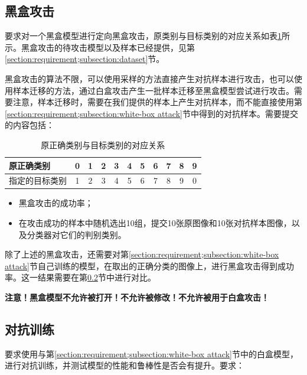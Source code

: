 \documentclass[journal, a4paper]{IEEEtran}
\begin{document}
\subsection{黑盒攻击}
\label{section:requirement;subsection:black-box attack}

要求对一个黑盒模型进行定向黑盒攻击，原类别与目标类别的对应关系如表\ref{table:label}所示。黑盒攻击的待攻击模型以及样本已经提供，见第\ref{section:requirement;subsection:dataset}节。

黑盒攻击的算法不限，可以使用采样的方法直接产生对抗样本进行攻击，也可以使用样本迁移的方法，通过白盒攻击产生一批样本迁移至黑盒模型尝试进行攻击。需要注意，样本迁移时，需要在我们提供的样本上产生对抗样本，而不能直接使用第\ref{section:requirement;subsection:white-box attack}节中得到的对抗样本。需要提交的内容包括：

\begin{table}[t]\footnotesize
    \centering
    \begin{tabular}{lcccccccccc}
    \toprule
原正确类别 & 0 & 1 & 2 & 3 & 4 & 5 & 6 & 7 & 8 & 9 \\ 
    \midrule
指定的目标类别 & 1 & 2 & 3 & 4 & 5 & 6 & 7 & 8 & 9 & 0 \\
    \bottomrule
    \end{tabular}
    \caption{原正确类别与目标类别的对应关系}
    \label{table:label}
\end{table}

\begin{itemize}
    \item 黑盒攻击的成功率；
    \item 在攻击成功的样本中随机选出10组，提交10张原图像和10张对抗样本图像，以及分类器对它们的判别类别。
\end{itemize}

除了上述的黑盒攻击，还需要对第\ref{section:requirement;subsection:white-box attack}节自己训练的模型，在取出的正确分类的图像上，进行黑盒攻击得到成功率。这一结果需要在第\ref{section:requirement;subsection:adversarial training}节中进行对比。

\textbf{注意！黑盒模型不允许被打开！不允许被修改！不允许被用于白盒攻击！}

\subsection{对抗训练}
\label{section:requirement;subsection:adversarial training}

要求使用与第\ref{section:requirement;subsection:white-box attack}节中的白盒模型，进行对抗训练，并测试模型的性能和鲁棒性是否会有提升。要求：
\end{document}
